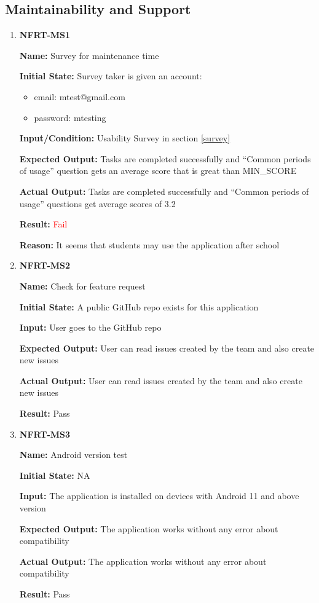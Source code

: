 \documentclass[12pt, titlepage]{article}
\begin{document}
\subsection{Maintainability and Support}
\begin{enumerate}
\item \textbf{NFRT-MS1}

\textbf{Name:} Survey for maintenance time

\textbf{Initial State:} Survey taker is given an account:
\begin{itemize}
\item email: mtest@gmail.com
\item password: mtesting
\end{itemize}

\textbf{Input/Condition:} Usability Survey in section \ref{survey}

\textbf{Expected Output:} Tasks are completed successfully and ``Common periods of usage'' question gets an average score that is great than MIN\_SCORE

\textbf{Actual Output:} Tasks are completed successfully and ``Common periods of usage'' questions get average scores of 3.2

\textbf{Result:} \textcolor{red}{Fail}

\textbf{Reason:} It seems that students may use the application after school

\item \textbf{NFRT-MS2}

\textbf{Name:} Check for feature request

\textbf{Initial State:} A public GitHub repo exists for this application

\textbf{Input:} User goes to the GitHub repo

\textbf{Expected Output:} User can read issues created by the team and also create new issues

\textbf{Actual Output:} User can read issues created by the team and also create new issues

\textbf{Result:} Pass

\item \textbf{NFRT-MS3}

\textbf{Name:} Android version test

\textbf{Initial State:} NA

\textbf{Input:} The application is installed on devices with Android 11 and above version

\textbf{Expected Output:} The application works without any error about compatibility

\textbf{Actual Output:} The application works without any error about compatibility

\textbf{Result:} Pass
\end{enumerate}
\end{document}
